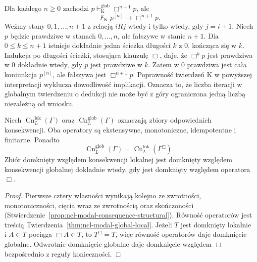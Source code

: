 \begin{center}
\end{center}

\begin{przyklad}
\label{ex:ncl-modal-global-no-uniform-bound}
Dla każdego $n\geq0$ zachodzi
$p\vdash_{\mathrm K}^{\mathrm{glob}}\Box^{n+1}p$,
ale
\[
 \nvdash_{\mathrm K} p^{[n]}\to\Box^{n+1}p.
\]
Weźmy stany $0,1,\ldots,n+1$ z relacją
$iRj$ wtedy i tylko wtedy, gdy $j=i+1$.
Niech $p$ będzie prawdziwe w stanach
$0,\ldots,n$, ale fałszywe w stanie $n+1$.
Dla $0\leq k\leq n+1$ istnieje dokładnie jedna
ścieżka długości $k$ z $0$, kończąca się w $k$.
Indukcja po długości ścieżki, stosująca
klauzulę $\Box$, daje, że $\Box^k p$ jest
prawdziwa w $0$ dokładnie wtedy, gdy $p$
jest prawdziwe w $k$.
Zatem w $0$ prawdziwa jest cała koniunkcja
$p^{[n]}$, ale fałszywa jest $\Box^{n+1}p$.
Poprawność twierdzeń K w powyższej interpretacji
wyklucza dowodliwość implikacji.
Oznacza to, że liczba iteracji w globalnym
twierdzeniu o dedukcji nie może być z góry
ograniczona jedną liczbą niezależną od wniosku.
\end{przyklad}

\begin{wniosek}
\label{cor:ncl-modal-theory-closure}
Niech $\operatorname{Cn}^{\mathrm{lok}}_L(\Gamma)$
oraz $\operatorname{Cn}^{\mathrm{glob}}_L(\Gamma)$
oznaczają zbiory odpowiednich konsekwencji.
Oba operatory są ekstensywne, monotoniczne,
idempotentne i finitarne. Ponadto
\[
 \operatorname{Cn}^{\mathrm{glob}}_L(\Gamma)
 =\operatorname{Cn}^{\mathrm{lok}}_L(\Gamma^\Box).
\]
Zbiór domknięty względem konsekwencji lokalnej
jest domknięty względem konsekwencji globalnej
dokładnie wtedy, gdy jest domknięty względem
operatora $\Box$.
\end{wniosek}
\begin{proof}
Pierwsze cztery własności wynikają kolejno
ze zwrotności, monotoniczności, cięcia wraz
ze zwrotnością oraz skończoności
(Stwierdzenie~\ref{prop:ncl-modal-consequence-structural}).
Równość operatorów jest treścią
Twierdzenia~\ref{thm:ncl-modal-global-local}.
Jeżeli $T$ jest domknięty lokalnie i
$A\in T$ pociąga $\Box A\in T$, to
$T^\Box=T$, więc równość operatorów daje
domknięcie globalne.
Odwrotnie domknięcie globalne daje domknięcie
względem $\Box$ bezpośrednio z reguły konieczności.
\end{proof}

